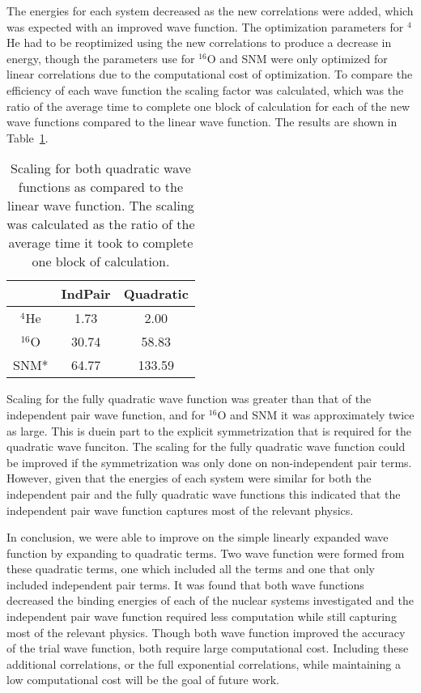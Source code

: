 \documentclass[12pt]{article}
\begin{document}
The energies for each system decreased as the new correlations were added, which was expected with an improved wave function. The optimization parameters for $^4$He had to be reoptimized using the new correlations to produce a decrease in energy, though the parameters use for $^{16}$O and SNM were only optimized for linear correlations due to the computational cost of optimization. To compare the efficiency of each wave function the scaling factor was calculated, which was the ratio of the average time to complete one block of calculation for each of the new wave functions compared to the linear wave function. The results are shown in Table~\ref{tab:scaling}.
\begin{table}[h!]
   \centering
   \caption{Scaling for both quadratic wave functions as compared to the linear wave function. The scaling was calculated as the ratio of the average time it took to complete one block of calculation.}
   \label{tab:scaling}
   \begin{tabular}{ccc}
      \hline \hline
       & IndPair & Quadratic\\
      \hline
      $^4$He & 1.73 & 2.00\\
      $^{16}$O & 30.74 & 58.83\\
      SNM* & 64.77 & 133.59\\
      \hline \hline
   \end{tabular}
\end{table}
Scaling for the fully quadratic wave function was greater than that of the independent pair wave function, and for $^{16}$O and SNM it was approximately twice as large. This is duein part to the explicit symmetrization that is required for the quadratic wave funciton. The scaling for the fully quadratic wave function could be improved if the symmetrization was only done on non-independent pair terms. However, given that the energies of each system were similar for both the independent pair and the fully quadratic wave functions this indicated that the independent pair wave function captures most of the relevant physics.

In conclusion, we were able to improve on the simple linearly expanded wave function by expanding to quadratic terms. Two wave function were formed from these quadratic terms, one which included all the terms and one that only included independent pair terms. It was found that both wave functions decreased the binding energies of each of the nuclear systems investigated and the independent pair wave function required less computation while still capturing most of the relevant physics. Though both wave function improved the accuracy of the trial wave function, both require large computational cost. Including these additional correlations, or the full exponential correlations, while maintaining a low computational cost will be the goal of future work.

\clearpage


\end{document}

